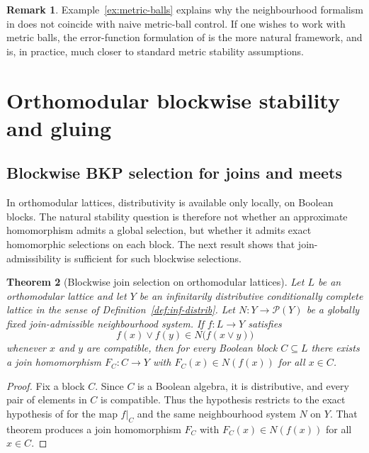 \documentclass[11pt]{amsart}
\newtheorem{theorem}{Theorem}[section]
\theoremstyle{definition}
\newtheorem{remark}[theorem]{Remark}
\newcommand{\join}{\vee}
\newcommand{\Pow}{\mathcal{P}}
\begin{document}
\begin{remark}\label{rem:metric-vs-neigh}
Example~\ref{ex:metric-balls} explains why the neighbourhood formalism in \cite{BKP} does not coincide with naive metric-ball control.
If one wishes to work with metric balls, the error-function formulation of \cite[Theorem~7]{BKP} is the more natural framework,
and is, in practice, much closer to standard metric stability assumptions.
\end{remark}

\section{Orthomodular blockwise stability and gluing}

\subsection{Blockwise BKP selection for joins and meets}
In orthomodular lattices, distributivity is available only locally, on Boolean blocks.
The natural stability question is therefore not whether an approximate homomorphism admits
a global selection, but whether it admits exact homomorphic selections on each block.
The next result shows that join-admissibility is sufficient for such blockwise selections.

\begin{theorem}[Blockwise join selection on orthomodular lattices]\label{thm:blockwise-join}
Let $L$ be an orthomodular lattice and let $Y$ be an infinitarily distributive conditionally complete lattice in the sense of Definition~\ref{def:inf-distrib}.
Let $N\colon Y\to\Pow(Y)$ be a globally fixed join-admissible neighbourhood system.
If $f\colon L\to Y$ satisfies
\[
f(x)\join f(y)\in N\bigl(f(x\join y)\bigr)
\]
whenever $x$ and $y$ are compatible, then for every Boolean block $C\subseteq L$ there exists a join homomorphism
$F_C\colon C\to Y$ with $F_C(x)\in N(f(x))$ for all $x\in C$.
\end{theorem}

\begin{proof}
Fix a block $C$.
Since $C$ is a Boolean algebra, it is distributive, and every pair of elements in $C$ is compatible.
Thus the hypothesis restricts to the exact hypothesis of \cite[Theorem~8]{BKP} for the map $f|_C$ and the same neighbourhood system $N$ on $Y$.
That theorem produces a join homomorphism $F_C$ with $F_C(x)\in N(f(x))$ for all $x\in C$.
\end{proof}
\end{document}
